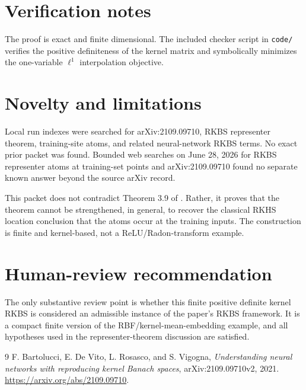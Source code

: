 \documentclass[11pt]{article}
\begin{document}
\section{Verification notes}

The proof is exact and finite dimensional.  The included checker script in
\texttt{code/} verifies the positive definiteness of the kernel matrix and
symbolically minimizes the one-variable \(\ell^1\) interpolation objective.

\section{Novelty and limitations}

Local run indexes were searched for arXiv:2109.09710, RKBS representer
theorem, training-site atoms, and related neural-network RKBS terms.  No exact
prior packet was found.  Bounded web searches on June 28, 2026 for RKBS
representer atoms at training-set points and arXiv:2109.09710 found no
separate known answer beyond the source arXiv record.

This packet does not contradict Theorem 3.9 of \cite{bartolucci2109}.  Rather,
it proves that the theorem cannot be strengthened, in general, to recover the
classical RKHS location conclusion that the atoms occur at the training inputs.
The construction is finite and kernel-based, not a ReLU/Radon-transform
example.

\section{Human-review recommendation}

The only substantive review point is whether this finite positive definite
kernel RKBS is considered an admissible instance of the paper's RKBS framework.
It is a compact finite version of the RBF/kernel-mean-embedding example, and
all hypotheses used in the representer-theorem discussion are satisfied.

\begin{thebibliography}{9}
F. Bartolucci, E. De Vito, L. Rosasco, and S. Vigogna,
\emph{Understanding neural networks with reproducing kernel Banach spaces},
arXiv:2109.09710v2, 2021.
\url{https://arxiv.org/abs/2109.09710}.
\end{thebibliography}
\end{document}
